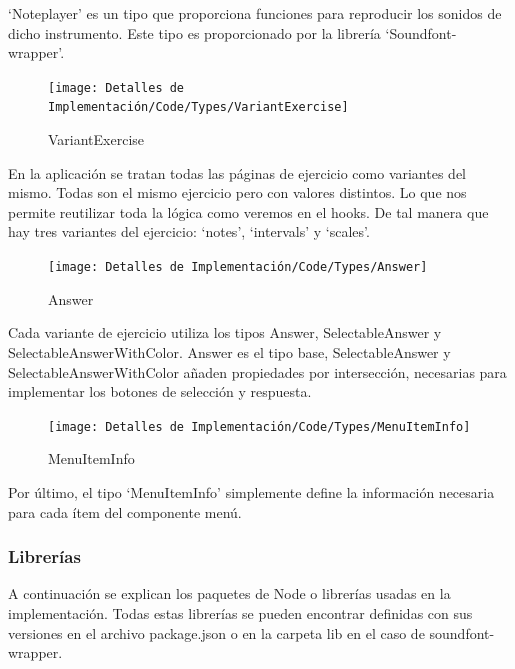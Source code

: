 \documentclass[12pt,twoside,titlepage]{report}
\begin{document}
‘Noteplayer’ es un tipo que proporciona funciones para reproducir los sonidos de dicho instrumento. Este tipo es proporcionado por la librería ‘Soundfont-wrapper’.

\begin{figure}[H]
    \centering
    \texttt{[image: Detalles de Implementación/Code/Types/VariantExercise]}
    \label{fig:VariantExercise}
    \caption{VariantExercise}
\end{figure}

En la aplicación se tratan todas las páginas de ejercicio como variantes del mismo. Todas son el mismo ejercicio pero con valores distintos. Lo que nos permite reutilizar toda la lógica como veremos en el hooks. De tal manera que hay tres variantes del ejercicio: ‘notes’, ‘intervals’ y ‘scales’. 

\begin{figure}[H]
    \centering
    \texttt{[image: Detalles de Implementación/Code/Types/Answer]}
    \label{fig:Answer}
    \caption{Answer}
\end{figure}

Cada variante de ejercicio utiliza los tipos Answer, SelectableAnswer y SelectableAnswerWithColor. Answer es el tipo base, SelectableAnswer y SelectableAnswerWithColor añaden propiedades por intersección, necesarias para implementar los botones de selección y respuesta. 

\begin{figure}[H]
    \centering
    \texttt{[image: Detalles de Implementación/Code/Types/MenuItemInfo]}
    \label{fig:MenuItemInfo}
    \caption{MenuItemInfo}
\end{figure}

Por último, el tipo ‘MenuItemInfo’ simplemente define la información necesaria para cada ítem del componente menú.

\subsubsection{Librerías}
A continuación se explican los paquetes de Node o librerías usadas en la implementación. Todas estas librerías se pueden encontrar definidas con sus versiones en el archivo package.json o en la carpeta lib en el caso de soundfont-wrapper.
\end{document}
